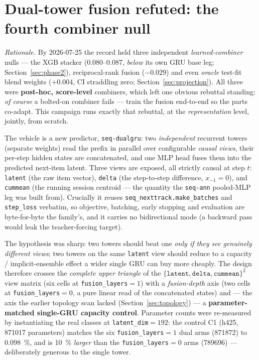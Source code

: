 \documentclass[11pt]{article}
\begin{document}
\section{Dual-tower fusion refuted: the fourth combiner null}
\label{sec:dualtower}
\emph{Rationale.} By 2026-07-25 the record held three independent
\emph{learned-combiner} nulls --- the XGB stacker (\numrange{0.080}{0.087},
\emph{below} its own GRU base leg; Section~\ref{sec:phase2}), reciprocal-rank
fusion ($-\num{0.029}$) and even \emph{oracle} test-fit blend weights
($+\num{0.004}$, CI straddling zero; Section~\ref{sec:projection}). All three
were \textbf{post-hoc, score-level} combiners, which left one obvious rebuttal
standing: \emph{of course} a bolted-on combiner fails --- train the fusion
end-to-end so the parts co-adapt. This campaign runs exactly that rebuttal, at
the \emph{representation} level, jointly, from scratch.

The vehicle is a new predictor, \texttt{seq-dualgru}: two \emph{independent}
recurrent towers (separate weights) read the prefix in parallel over
configurable \emph{causal views}, their per-step hidden states are concatenated,
and one MLP head fuses them into the predicted next-item latent. Three views are
exposed, all strictly causal at step $t$: \texttt{latent} (the raw item vector),
\texttt{delta} (the step-to-step difference, $x_{-1}=0$), and \texttt{cummean}
(the running session centroid --- the quantity the \texttt{seq-ann} pooled-MLP
leg was built from). Crucially it reuses \texttt{seq\_nexttrack.make\_batches}
and \texttt{step\_loss} verbatim, so objective, batching, early stopping and
evaluation are byte-for-byte the family's, and it carries no bidirectional mode
(a backward pass would leak the teacher-forcing target).

The hypothesis was sharp: two towers should beat one \emph{only if they see
genuinely different views}; two towers on the same \texttt{latent} view should
reduce to a capacity / implicit-ensemble effect a wider single GRU can buy more
cheaply. The design therefore crosses the \emph{complete upper triangle} of the
$\{\texttt{latent},\texttt{delta},\texttt{cummean}\}^2$ view matrix (six cells at
\texttt{fusion\_layers}${}=1$) with a \emph{fusion-depth} axis (two cells at
\texttt{fusion\_layers}${}=0$, a pure linear read of the concatenated states) and
--- the axis the earlier topology scan lacked (Section~\ref{sec:topology}) --- a
\textbf{parameter-matched single-GRU capacity control}. Parameter counts were
re-measured by instantiating the real classes at \texttt{latent\_dim}${}=192$:
the control C1 (h425, \num{871017} parameters) matches the six
\texttt{fusion\_layers}${}=1$ dual arms (\num{871872}) to
\SI{0.098}{\percent}, and is \SI{10}{\percent} \emph{larger} than the
\texttt{fusion\_layers}${}=0$ arms (\num{789696}) --- deliberately generous to
the single tower.
\end{document}
